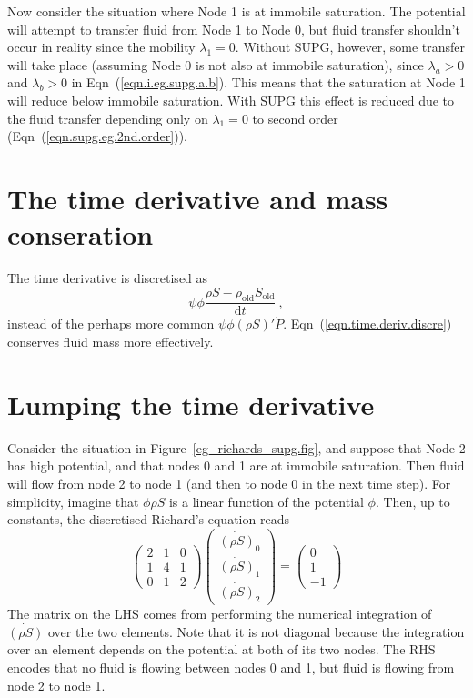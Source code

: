\documentclass[]{scrreprt}
\begin{document}
Now consider the situation where Node 1 is at immobile saturation.  The
potential will attempt to transfer fluid from Node 1 to Node 0, but
fluid transfer shouldn't occur in reality since the mobility
$\lambda_{1}=0$.  Without SUPG, however, some transfer will take place
(assuming Node 0 is not also at immobile saturation), since
$\lambda_{a}> 0$ and $\lambda_{b}>0$ in
Eqn~(\ref{eqn.i.eg.supg.a.b}).  This means that the saturation at Node
1 will reduce below immobile saturation.  With SUPG this effect is
reduced due to the fluid transfer depending only on $\lambda_{1}=0$ to second
order (Eqn~(\ref{eqn.supg.eg.2nd.order})).



\section{The time derivative and mass conseration}

The time derivative is discretised as
\begin{equation}
\psi\phi \frac{\rho S -
  \rho_{\mathrm{old}}S_{\mathrm{old}}}{\mathrm{d}t} \ ,
\label{eqn.time.deriv.discre}
\end{equation}
instead of the perhaps more common $\psi\phi (\rho S)'\dot{P}$.
Eqn~(\ref{eqn.time.deriv.discre}) conserves fluid mass more
effectively.


\section{Lumping the time derivative}
\label{sec.lumping.timde.deriv}

Consider the situation in Figure~\ref{eg_richards_supg.fig}, and
suppose that Node 2 has high potential, and that nodes 0 and 1 are at
immobile saturation.  Then fluid will flow from node 2 to node 1 (and
then to node 0 in the next time step).  For simplicity, imagine that
$\phi\rho S$ is a linear
function of the potential $\phi$.  Then, up to constants, the
discretised Richard's equation reads
\begin{equation}
\left(
\begin{array}{ccc}
2 & 1 & 0 \\
1 & 4 & 1 \\
0 & 1 & 2
\end{array}
\right)
\left(
\begin{array}{c}
\dot{(\rho S)}_{0} \\
\dot{(\rho S)}_{1} \\
\dot{(\rho S)}_{2}
\end{array}
\right)
=
\left(
\begin{array}{c}
0 \\
1 \\
-1
\end{array}
\right)
\end{equation}
The matrix on the LHS comes from performing the numerical integration
of $\dot{(\rho S)}$ over the two elements.  Note that it is not diagonal
because the integration over an element depends on the potential at
both of its two nodes.  The RHS encodes that no fluid is flowing
between nodes 0 and 1, but fluid is flowing from node 2 to node 1.
\end{document}

